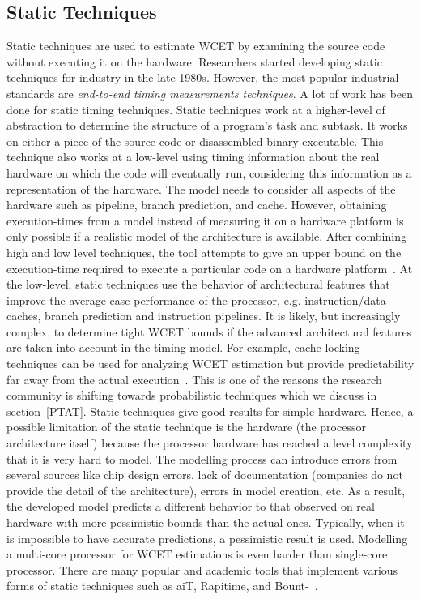\subsection{Static Techniques}


Static techniques are used to estimate WCET by examining the source code without executing it on the hardware. Researchers started developing static techniques for industry in the late 1980s. However, the most popular industrial standards are \textit{end-to-end timing measurements techniques}. A lot of work has been done for static timing techniques. Static techniques work at a higher-level of abstraction to determine the structure of a program's task and subtask. It works on either a piece of the source code or disassembled binary executable. This technique also works at a low-level using timing information about the real hardware on which the code will eventually run, considering this information as a representation of the hardware. The model needs to consider all aspects of the hardware such as pipeline, branch prediction, and cache. However, obtaining execution-times from a model instead of measuring it on a hardware platform is only possible if a realistic model of the architecture is available. After combining high and low level techniques, the tool attempts to give an upper bound on the execution-time required to execute a particular code on a hardware platform~\cite{wilhelm2008worst}. At the low-level, static techniques use the behavior of architectural features that improve the average-case performance of the processor, e.g. instruction/data caches, branch prediction and instruction pipelines. It is likely, but increasingly complex, to determine tight WCET bounds if the advanced architectural features are taken into account in the timing model. For example, cache locking techniques can be used for analyzing WCET estimation but provide predictability far away from the actual execution~\cite{bernat2002wcet}. This is one of the reasons the research community is shifting towards probabilistic techniques which we discuss in section~\ref{PTAT}. Static techniques give good results for simple hardware. Hence, a possible limitation of the static technique is the hardware (the processor architecture itself) because the processor hardware has reached a level complexity that it is very hard to model. The modelling process can introduce errors from several sources like chip design errors, lack of documentation (companies do not provide the detail of the architecture), errors in model creation, etc. As a result, the developed model predicts a different behavior to that observed on real hardware with more pessimistic bounds than the actual ones. Typically, when it is impossible to have accurate predictions, a pessimistic result is used. Modelling a multi-core processor for WCET estimations is even harder than single-core processor. There are many popular and academic tools that implement various forms of static techniques such as aiT, Rapitime, and Bount-~\cite{wilhelm2008worst}.


